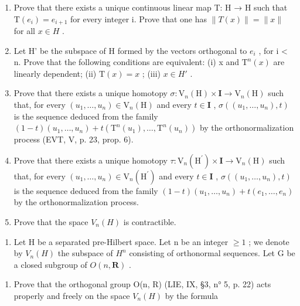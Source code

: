 \begin{enumerate}
\def\labelenumi{\alph{enumi})}
\item
  Prove that there exists a unique continuous linear map T: H → H such that \(\mathrm{T}(e_{i}) = e_{i+1}\) for every integer i. Prove that one has \(\|T(x)\| = \|x\|\) for all \(x \in H\) .
\item
  Let H' be the subspace of H formed by the vectors orthogonal to \(e_{i}\) , for i \textless{} n. Prove that the following conditions are equivalent: (i) x and \(\mathrm{T}^{n}(x)\) are linearly dependent; (ii) \(\mathrm{T}(x) = x\) ; (iii) \(x \in H'\) .
\item
  Prove that there exists a unique homotopy \(\sigma\colon\mathrm{V}_{n}(\mathrm{H})\times\mathbf{I}\to\mathrm{V}_{n}(\mathrm{H})\) such that, for every \((u_{1},\ldots,u_{n})\in\mathrm{V}_{n}(\mathrm{H})\) and every \(t\in\mathbf{I}\) , \(\sigma((u_{1},\ldots,u_{n}),t)\) is the sequence deduced from the family \((1-t)(u_{1},\ldots,u_{n})+t(\mathrm{T}^{n}(u_{1}),\ldots,\mathrm{T}^{n}(u_{n}))\) by the orthonormalization process (EVT, V, p. 23, prop. 6).
\item
  Prove that there exists a unique homotopy \(\tau\colon\mathrm{V}_{n}(\mathrm{H}^{\prime})\times\mathbf{I}\to\mathrm{V}_{n}(\mathrm{H})\) such that, for every \((u_{1},\ldots,u_{n})\in\mathrm{V}_{n}(\mathrm{H}^{\prime})\) and every \(t\in\mathbf{I}\) , \(\sigma((u_{1},\ldots,u_{n}),t)\) is the sequence deduced from the family \((1-t)(u_{1},\ldots,u_{n})+t(e_{1},\ldots,e_{n})\) by the orthonormalization process.
\item
  Prove that the space \(V_{n}(H)\) is contractible.
\end{enumerate}

\begin{enumerate}
\def\labelenumi{\arabic{enumi})}
\setcounter{enumi}{2}
\tightlist
\item
  Let H be a separated pre-Hilbert space. Let n be an integer \(\geqslant 1\) ; we denote by \(V_{n}(H)\) the subspace of \(H^{n}\) consisting of orthonormal sequences. Let G be a closed subgroup of \(O(n, \mathbf{R})\) .
\end{enumerate}

\begin{enumerate}
\def\labelenumi{\alph{enumi})}
\tightlist
\item
   Prove that the orthogonal group O(n, R) (LIE, IX, §3, n° 5, p. 22) acts properly and freely on the space \(V_{n}(H)\) by the formula
\end{enumerate}

